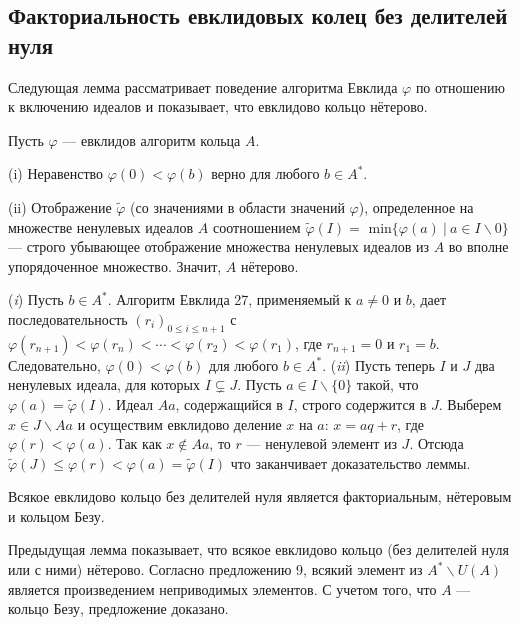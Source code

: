 \subsection{Факториальность евклидовых колец без делителей нуля}
Следующая лемма рассматривает поведение алгоритма Евклида $\varphi$ по отношению к включению идеалов и показывает, что евклидово кольцо нётерово.\newline
\begin{lemma}

\hspace*{15pt}Пусть $\varphi$ — евклидов алгоритм кольца $A$.

(i) Неравенство $\varphi(0) < \varphi(b)$ верно для любого $b \in A^*.$

(ii) Отображение $\tilde{\varphi}$ (со значениями в области значений $\varphi$),  
определенное на множестве ненулевых идеалов $A$ соотношением $\tilde{\varphi}(I) =$ min$\{\varphi(a)\:|\: a \in I \backslash 0\} $
 — строго убывающее отображение множества 
ненулевых идеалов из $A$ во вполне упорядоченное множество. Значит, $A$ нётерово. 
\end{lemma}
\pagebreak

\begin{myproof}
(\textit{i}) Пусть $b \in A^*$. Алгоритм Евклида 27, применяемый к $a \neq 0$ и $b$, дает последовательность $(r_i)_{0\leqslant i\leqslant n+1}$ с $\varphi(r_{n+1})< \varphi(r_n)< \cdots < \varphi(r_2) <\varphi(r_1)$, где $r_{n+1} = 0$ и $r_1 = b$. Следовательно, $\varphi(0) < \varphi(b)$ для любого $b \in A^*$.\newline
(\textit{ii}) Пусть теперь $I$ и $J$ два ненулевых идеала, для которых $I \subsetneq J$. Пусть $a \in I \backslash  \{0\}$ такой, что $\varphi(a) = \tilde{\varphi}(I)$. Идеал $Aa$, содержащийся в $I$, строго содержится в $J$. Выберем $x \in J \backslash Aa$ и осуществим евклидово деление $x$ на $a$: $x = aq + r$, где $\varphi(r) < \varphi(a)$. Так как $x \notin Aa$, то $r$ — ненулевой элемент из $J$. Отсюда $\tilde{\varphi}(J)\leqslant \varphi(r) < \varphi(a) =\tilde{\varphi}(I)$ что заканчивает доказательство леммы.
\end{myproof}

\begin{predl}
\hspace*{15pt}Всякое евклидово кольцо без делителей нуля является факториальным, нётеровым и кольцом Безу.
\end{predl}


\begin{myproof}
Предыдущая лемма показывает, что всякое евклидово кольцо (без делителей нуля или с ними) нётерово. Согласно предложению 9, всякий элемент из $A^* \backslash U(A)$ является произведением неприводимых элементов. С учетом того, что $A$ — кольцо Безу, предложение доказано.
\end{myproof}

